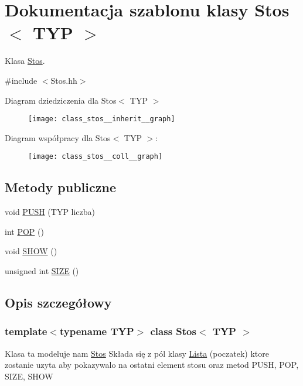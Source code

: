 \hypertarget{class_stos}{
\section{Dokumentacja szablonu klasy Stos$<$ TYP $>$}
\label{class_stos}
}


Klasa \hyperlink{class_stos}{Stos}.  




{\ttfamily \#include $<$Stos.hh$>$}



Diagram dziedziczenia dla Stos$<$ TYP $>$
\nopagebreak
\begin{figure}[H]
\begin{center}
\leavevmode
\texttt{[image: class\_stos\_\_inherit\_\_graph]}
\end{center}
\end{figure}


Diagram współpracy dla Stos$<$ TYP $>$:
\nopagebreak
\begin{figure}[H]
\begin{center}
\leavevmode
\texttt{[image: class\_stos\_\_coll\_\_graph]}
\end{center}
\end{figure}
\subsection*{Metody publiczne}
\begin{DoxyCompactItemize}
\item 
void \hyperlink{class_stos_a773cf22cb5c67bda0d2878a1ec8bc363}{PUSH} (TYP liczba)
\item 
int \hyperlink{class_stos_ab8b0ecec7cbe0ae761bfee9d9e47d5d4}{POP} ()
\item 
void \hyperlink{class_stos_a8f1c40b779a699c84b20eeb59ca67f06}{SHOW} ()
\item 
unsigned int \hyperlink{class_stos_a6ff0d2aa5946c0dc413e3236ca99fd26}{SIZE} ()
\end{DoxyCompactItemize}


\subsection{Opis szczegółowy}
\subsubsection*{template$<$typename TYP$>$ class Stos$<$ TYP $>$}

Klasa ta modeluje nam \hyperlink{class_stos}{Stos} Składa się z pól klasy \hyperlink{class_lista}{Lista} (poczatek) ktore zostanie uzyta aby pokazywalo na ostatni element stosu oraz metod PUSH, POP, SIZE, SHOW 

